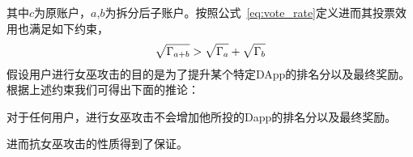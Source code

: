 其中$c$为原账户，$a$,$b$为拆分后子账户。按照公式~\ref{eq:vote_rate}定义进而其投票效用也满足如下约束，
\begin{align}
\label{eq:sqrt_nr}
\sqrt{\Gamma_{a+b}}>\sqrt{\Gamma_a}+\sqrt{\Gamma_b}
\end{align}
假设用户进行女巫攻击的目的是为了提升某个特定DApp的排名分以及最终奖励。根据上述约束我们可得出下面的推论：
\begin{property}
	\label{p3}
	对于任何用户，进行女巫攻击不会增加他所投的Dapp的排名分以及最终奖励。
\end{property}
进而抗女巫攻击的性质得到了保证。

	
	
